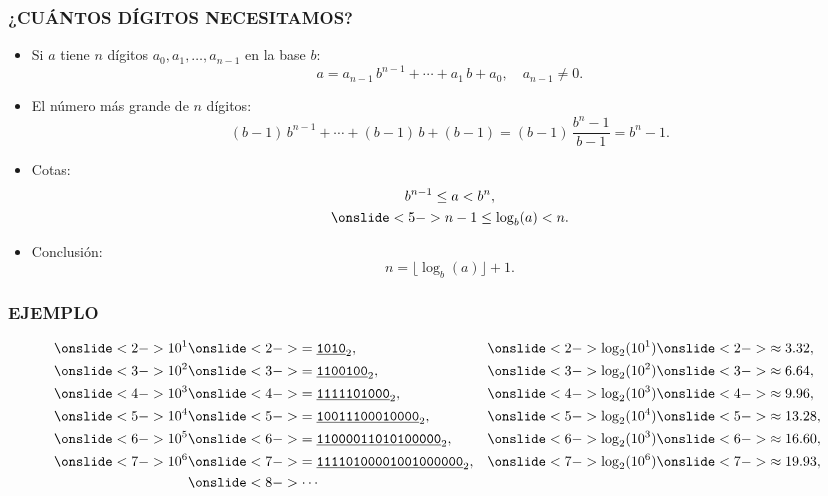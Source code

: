 \begin{frame}
  \frametitle{¿CUÁNTOS DÍGITOS NECESITAMOS?}

  \begin{itemize}
  \item<2-> Si $a$ tiene $n$ dígitos $a_0,a_1,\ldots,a_{n-1}$
    en la base $b$:
    \[ a = a_{n-1}\,b^{n-1} + \cdots + a_1\,b + a_0,
      \quad
      a_{n-1} \ne 0. \]

  \item<3-> El número más grande de $n$ dígitos:
    \[ (b-1)\,b^{n-1} + \cdots + (b-1)\,b + (b-1) = (b-1)\,\frac{b^n - 1}{b-1} = b^n - 1. \]

  \item<4-> Cotas:
    \begin{gather*}
      b^{n-1} \le a < b^n, \\
      \onslide<5->{n-1 \le \log_b (a) < n.}
    \end{gather*}

  \item<6-> Conclusión:
    \[ n = \lfloor\log_b (a)\rfloor + 1. \]
  \end{itemize}
\end{frame}

\begin{frame}
  \frametitle{EJEMPLO}

  \begin{align*}
    \onslide<2->{10^1} & \onslide<2->{= \underline{\text{\texttt{1010}}}_2,} & \onslide<2->{\log_2 (10^1)} & \onslide<2->{\approx 3.32,} \\
    \onslide<3->{10^2} & \onslide<3->{= \underline{\text{\texttt{1100100}}}_2,} & \onslide<3->{\log_2 (10^2)} & \onslide<3->{\approx 6.64,} \\
    \onslide<4->{10^3} & \onslide<4->{= \underline{\text{\texttt{1111101000}}}_2,} & \onslide<4->{\log_2 (10^3)} & \onslide<4->{\approx 9.96,} \\
    \onslide<5->{10^4} & \onslide<5->{= \underline{\text{\texttt{10011100010000}}}_2,} & \onslide<5->{\log_2 (10^4)} & \onslide<5->{\approx 13.28,} \\
    \onslide<6->{10^5} & \onslide<6->{= \underline{\text{\texttt{11000011010100000}}}_2,} & \onslide<6->{\log_2 (10^3)} & \onslide<6->{\approx 16.60,} \\
    \onslide<7->{10^6} & \onslide<7->{= \underline{\text{\texttt{11110100001001000000}}}_2,} & \onslide<7->{\log_2 (10^6)} & \onslide<7->{\approx 19.93,} \\
       & \onslide<8->{\cdots}
  \end{align*}
\end{frame}

